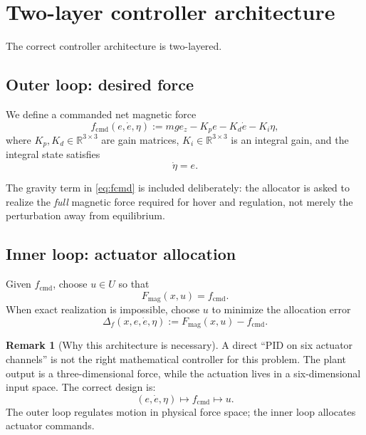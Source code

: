 \documentclass[11pt]{article}
\theoremstyle{definition}
\newtheorem{remark}{Remark}
\begin{document}
\section{Two-layer controller architecture}

The correct controller architecture is two-layered.

\subsection*{Outer loop: desired force}
We define a commanded net magnetic force
\begin{equation}
 f_{\mathrm{cmd}}(e,\dot e,\eta)
 := mg e_z - K_p e - K_d \dot e - K_i \eta,
 \label{eq:fcmd}
\end{equation}
where $K_p, K_d \in \mathbb{R}^{3\times 3}$ are gain matrices, $K_i \in \mathbb{R}^{3\times 3}$ is an integral gain, and the integral state satisfies
\begin{equation}
 \dot \eta = e.
 \label{eq:eta}
\end{equation}

The gravity term in \eqref{eq:fcmd} is included deliberately: the allocator is asked to realize the \emph{full} magnetic force required for hover and regulation, not merely the perturbation away from equilibrium.

\subsection*{Inner loop: actuator allocation}
Given $f_{\mathrm{cmd}}$, choose $u \in U$ so that
\begin{equation}
 F_{\mathrm{mag}}(x,u) = f_{\mathrm{cmd}}.
 \label{eq:alloc_exact}
\end{equation}
When exact realization is impossible, choose $u$ to minimize the allocation error
\begin{equation}
 \Delta_f(x,e,\dot e,\eta)
 := F_{\mathrm{mag}}(x,u) - f_{\mathrm{cmd}}.
 \label{eq:def_deltaf}
\end{equation}

\begin{remark}[Why this architecture is necessary]
A direct ``PID on six actuator channels'' is not the right mathematical controller for this problem. The plant output is a three-dimensional force, while the actuation lives in a six-dimensional input space. The correct design is:
\[
(e,\dot e,\eta) \mapsto f_{\mathrm{cmd}} \mapsto u.
\]
The outer loop regulates motion in physical force space; the inner loop allocates actuator commands.
\end{remark}
\end{document}
